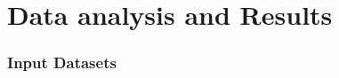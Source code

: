 \section{Data analysis and Results}
 

\begin{frame}
 \frametitle{Input Datasets}
 \framesubtitle{}
 \label{ch3:data}

\end{frame}
\note{}




